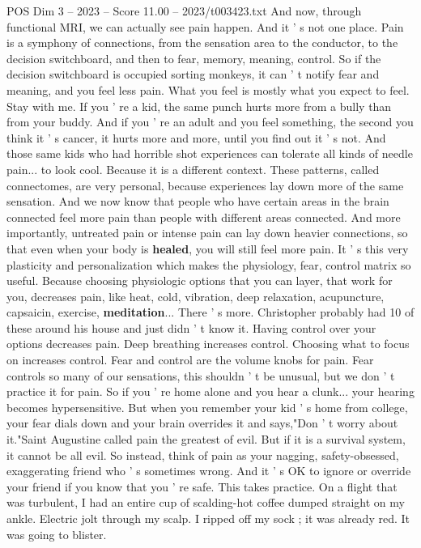 \begin{textsample}{POS Dim 3 – 2023 – Score 11.00 – 2023/t003423.txt}
And now, through functional MRI, we can actually see pain happen.
And it ' s not one place.
Pain is a symphony of connections, from the sensation area to the conductor, to the decision switchboard, and then to fear, memory, meaning, control.
So if the decision switchboard is occupied sorting monkeys, it can ' t notify fear and meaning, and you feel less pain.
What you feel is mostly what you expect to feel.
Stay with me.
If you ' re a kid, the same punch hurts more from a bully than from your buddy.
And if you ' re an adult and you feel something, the second you think it ' s cancer, it hurts more and more, until you find out it ' s not.
And those same kids who had horrible shot experiences can tolerate all kinds of needle pain... to look cool.
Because it is a different context.
These patterns, called connectomes, are very personal, because experiences lay down more of the same sensation.
And we now know that people who have certain areas in the brain connected feel more pain than people with different areas connected.
And more importantly, untreated pain or intense pain can lay down heavier connections, so that even when your body is \textbf{healed}, you will still feel more pain.
It ' s this very plasticity and personalization which makes the physiology, fear, control matrix so useful.
Because choosing physiologic options that you can layer, that work for you, decreases pain, like heat, cold, vibration, deep relaxation, acupuncture, capsaicin, exercise, \textbf{meditation}...
There ' s more.
Christopher probably had 10 of these around his house and just didn ' t know it.
Having control over your options decreases pain.
Deep breathing increases control.
Choosing what to focus on increases control.
Fear and control are the volume knobs for pain.
Fear controls so many of our sensations, this shouldn ' t be unusual, but we don ' t practice it for pain.
So if you ' re home alone and you hear a clunk... your hearing becomes hypersensitive.
But when you remember your kid ' s home from college, your fear dials down and your brain overrides it and says,"Don ' t worry about it."Saint Augustine called pain the greatest of evil.
But if it is a survival system, it cannot be all evil.
So instead, think of pain as your nagging, safety-obsessed, exaggerating friend who ' s sometimes wrong.
And it ' s OK to ignore or override your friend if you know that you ' re safe.
This takes practice.
On a flight that was turbulent, I had an entire cup of scalding-hot coffee dumped straight on my ankle.
Electric jolt through my scalp.
I ripped off my sock ; it was already red.
It was going to blister.

\end{textsample}
